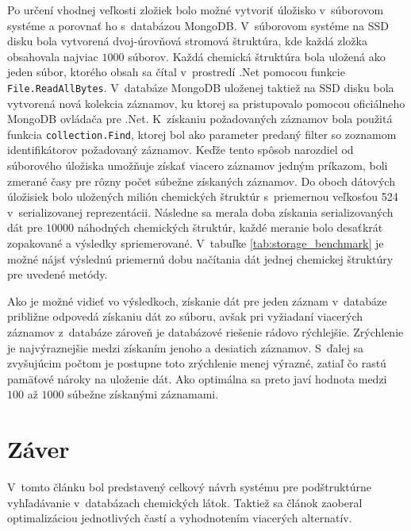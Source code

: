 \documentclass[slovak]{ExcelAtFIT} %
\begin{document}
Po určení vhodnej veľkosti zložiek bolo možné vytvoriť úložisko v~súborovom systéme a porovnať ho s~databázou MongoDB. V~súborovom systéme na SSD disku bola vytvorená dvoj-úrovňová stromová štruktúra, kde každá zložka obsahovala najviac $1000$ súborov. Každá chemická štruktúra bola uložená ako jeden súbor, ktorého obsah sa čítal v~prostredí .Net pomocou funkcie \texttt{File.ReadAllBytes}. V~databáze MongoDB uloženej taktiež na SSD disku bola vytvorená nová kolekcia záznamov, ku ktorej sa pristupovalo pomocou oficiálneho MongoDB ovládača pre .Net. K~získaniu požadovaných záznamov bola použitá funkcia \texttt{collection.Find}, ktorej bol ako parameter predaný filter so zoznamom identifikátorov požadovaný záznamov. Keďže tento spôsob narozdiel od súborového úložiska umožňuje získať viacero záznamov jedným príkazom, boli zmerané časy pre rôzny počet súbežne získaných záznamov. Do oboch dátových úložisiek bolo uložených milión chemických štruktúr s~priemernou veľkosťou \SI{524}{\byte} v~serializovanej reprezentácii. Následne sa merala doba získania serializovaných dát pre $10000$ náhodných chemických štruktúr, každé meranie bolo desaťkrát zopakované a výsledky spriemerované. V~tabuľke \ref{tab:storage_benchmark} je možné nájsť výslednú priemernú dobu načítania dát jednej chemickej štruktúry pre uvedené metódy.

Ako je možné vidieť vo výsledkoch, získanie dát pre jeden záznam v~databáze približne odpovedá zí\-ska\-niu dát zo súboru, avšak pri vyžiadaní viacerých záznamov z~databáze zároveň je databázové riešenie rádovo rý\-chlej\-šie. Zrýchlenie je najvýraznejšie medzi získaním jenoho a desiatich záznamov. S~ďalej sa zvyšujúcim počtom je postupne toto zrýchlenie menej výrazné, zatiaľ čo rastú pamäťové nároky na uloženie dát. Ako optimálna sa preto javí hodnota medzi $100$ až $1000$ súbežne získanými záznamami.

\section{Záver}
\label{sec:Conclusions}

V~tomto článku bol predstavený celkový návrh systému pre podštruktúrne vyhľadávanie v~databázach che\-mic\-kých látok. Taktiež sa článok zaoberal optimalizáciou jednotlivých častí a vyhodnotením viacerých alternatív.
\end{document}
